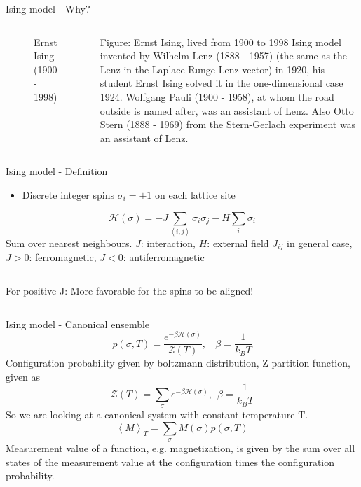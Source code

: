 \documentclass[]{beamer}
\begin{document}
\begin{frame}{Ising model - Why?}
\begin{columns}[c]
\begin{figure}[p]
		\caption{Ernst Ising (1900 - 1998)}
		\label{fig:awesome_image}
	\end{figure}
	 {Figure: Ernst Ising, lived from 1900 to 1998}
	 {Ising model invented by Wilhelm Lenz (1888 - 1957) (the same as the Lenz in the Laplace-Runge-Lenz vector) in 1920, his student Ernst Ising solved it in the one-dimensional case 1924.}
	 {Wolfgang Pauli (1900 - 1958), at whom the road outside is named after, was an assistant of Lenz.}
	 {Also Otto Stern (1888 - 1969) from the Stern-Gerlach experiment was an assistant of Lenz.}
\end{columns}
\end{frame}

\begin{frame}{Ising model - Definition}
\begin{itemize}
	 {Lattice with \(N\) sites.}
\item<2-> Discrete integer spins \( \sigma_i = \pm 1 \) on each lattice site
\end{itemize}
\pause
\[ \mathscr{H}(\sigma) = -J \sum\limits_{\left< i, j \right>} \sigma_i \sigma_j - H \sum\limits_i \sigma_i \]
	 {Sum over nearest neighbours.}
	 {\( J \): interaction, \( H \): external field}
	 {\( J_{ij} \) in general case, \( J>0 \): ferromagnetic, \( J<0 \): antiferromagnetic}
\pause
\begin{columns}[c]
	\def\svgwidth{.5\textwidth}
	\centering
	
	\def\svgwidth{.5\textwidth}
	\centering
	
		 {For positive J: More favorable for the spins to be aligned!}
\end{columns}
\end{frame}

\begin{frame}{Ising model - Canonical ensemble}
\pause
\[ p(\sigma, T) = \frac{e^{-\beta \mathscr{H}(\sigma)}}{\mathscr{Z}(T)}, \ \ \ \ \beta=\frac{1}{k_B T}\]
	 {Configuration probability given by boltzmann distribution, Z partition function, given as \[ \mathscr{Z}(T) = \sum_\sigma e^{-\beta \mathscr{H}(\sigma)},\ \ \beta = \frac{1}{k_B T} \]}
	 {So we are looking at a canonical system with constant temperature T.}
\pause
\[ \left< M \right>_T = \sum_\sigma M(\sigma)p(\sigma,T) \]
	 {Measurement value of a function, e.g. magnetization, is given by the sum over all states of the measurement value at the configuration times the configuration probability.}
\end{frame}
\end{document}
